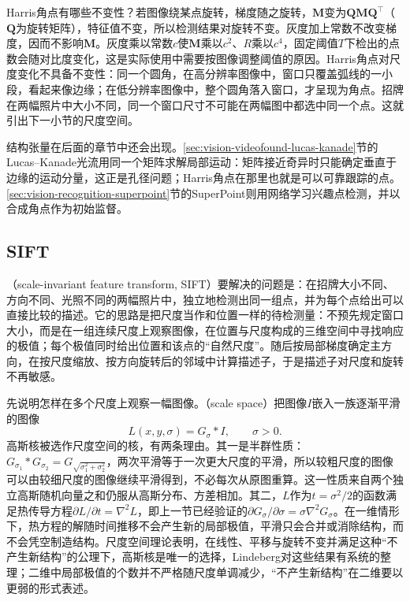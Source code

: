 Harris角点有哪些不变性？若图像绕某点旋转，梯度随之旋转，$\bm M$变为$\bm Q\bm M\bm Q^{\top}$（$\bm Q$为旋转矩阵），特征值不变，所以检测结果对旋转不变。灰度加上常数不改变梯度，因而不影响$\bm M$。灰度乘以常数$c$使$\bm M$乘以$c^2$、$R$乘以$c^4$，固定阈值$T$下检出的点数会随对比度变化，这是实际使用中需要按图像调整阈值的原因。Harris角点对尺度变化不具备不变性：同一个圆角，在高分辨率图像中，窗口只覆盖弧线的一小段，看起来像边缘；在低分辨率图像中，整个圆角落入窗口，才呈现为角点。招牌在两幅照片中大小不同，同一个窗口尺寸不可能在两幅图中都选中同一个点。这就引出下一小节的尺度空间。

结构张量在后面的章节中还会出现。\ref{sec:vision-videofound-lucas-kanade}节的Lucas–Kanade光流用同一个矩阵求解局部运动：矩阵接近奇异时只能确定垂直于边缘的运动分量，这正是孔径问题；Harris角点在那里也就是可以可靠跟踪的点。\ref{sec:vision-recognition-superpoint}节的SuperPoint则用网络学习兴趣点检测，并以合成角点作为初始监督。

\subsection{SIFT}
\label{sec:vision-features-sift}

（scale-invariant feature transform, SIFT）要解决的问题是：在招牌大小不同、方向不同、光照不同的两幅照片中，独立地检测出同一组点，并为每个点给出可以直接比较的描述。它的思路是把尺度当作和位置一样的待检测量：不预先规定窗口大小，而是在一组连续尺度上观察图像，在位置与尺度构成的三维空间中寻找响应的极值；每个极值同时给出位置和该点的“自然尺度”。随后按局部梯度确定主方向，在按尺度缩放、按方向旋转后的邻域中计算描述子，于是描述子对尺度和旋转不再敏感。

先说明怎样在多个尺度上观察一幅图像。（scale space）把图像$I$嵌入一族逐渐平滑的图像
\begin{equation}
  L(x,y,\sigma)=G_{\sigma}*I,\qquad \sigma>0.
  \label{eq:vision-features-scale-space}
\end{equation}
高斯核被选作尺度空间的核，有两条理由。其一是半群性质：$G_{\sigma_1}*G_{\sigma_2}=G_{\sqrt{\sigma_1^2+\sigma_2^2}}$，两次平滑等于一次更大尺度的平滑，所以较粗尺度的图像可以由较细尺度的图像继续平滑得到，不必每次从原图重算。这一性质来自两个独立高斯随机向量之和仍服从高斯分布、方差相加。其二，$L$作为$t=\sigma^2/2$的函数满足热传导方程$\partial L/\partial t=\nabla^2L$，即上一节已经验证的$\partial G_{\sigma}/\partial\sigma=\sigma\nabla^2G_{\sigma}$。在一维情形下，热方程的解随时间推移不会产生新的局部极值，平滑只会合并或消除结构，而不会凭空制造结构。尺度空间理论表明，在线性、平移与旋转不变并满足这种“不产生新结构”的公理下，高斯核是唯一的选择，Lindeberg对这些结果有系统的整理；二维中局部极值的个数并不严格随尺度单调减少，“不产生新结构”在二维要以更弱的形式表述。

